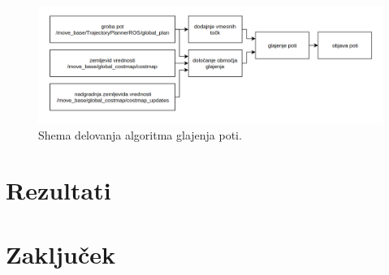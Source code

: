 \documentclass[10pt,a4paper]{article}
\begin{document}
\begin{figure}[H]
	\centering
	\includegraphics[width=16cm]{pic/shema.png}
	\caption{Shema delovanja algoritma glajenja poti.}
	\label{fig:slika6}
\end{figure}

\section{Rezultati}

\section{Zaključek}
\end{document}
